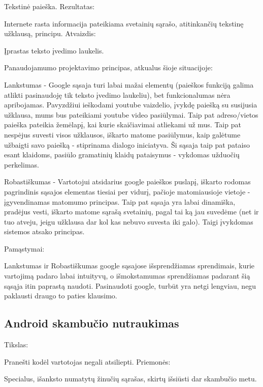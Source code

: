 ﻿\documentclass[a4paper, 12pt]{article}
\begin{document}
		Tekstinė paieška.\newline
		Rezultatas:

		Internete rasta informacija pateikiama svetainių sąrašo, atitinkančių tekstinę užklausą, principu.\newline
		Atvaizdis:

		Įprastas teksto įvedimo laukelis.\newline

		Panaudojamumo projektavimo principas, atkualus šioje situacijoje:

		Lankstumas - Google sąsaja turi labai mažai elementų (paieškos funkciją galima atlikti pasinaudoję tik teksto įvedimo laukeliu),
		bet funkcionalumas nėra apribojamas. Pavyzdžiui ieškodami youtube vaizdelio, įvykdę paiešką su susijusia užklausa, mums bus pateikiami
		youtube video pasiūlymai. Taip pat adreso/vietos paieška pateikia žemėlapį, kai kurie skaičiavimai atliekami už mus. Taip pat nespėjus
		suvesti visos užklausos, iškarto matome pasiūlymus, kaip galėtume užbaigti savo paiešką - stiprinama dialogo iniciatyva. Ši sąsaja
		taip pat pataiso esant klaidoms, pasiūlo gramatinių klaidų pataisymus - vykdomas užduočių perkelimas.

		Robastiškumas - Vartotojui atsidarius google paieškos puslapį, iškarto rodomas pagrindinis sąsajos elementas tiesiai per vidurį,
		pačioje matomiausioje vietoje - įgyvendinamas matomumo principas. Taip pat sąsaja yra labai dinamiška, pradėjus vesti, iškarto
		matome sąrašą svetainių, pagal tai ką jau suvedėme (net ir tuo atveju, jeigu užklausa dar kol kas nebuvo suvesta iki galo). Taigi
		įvykdomas sistemos atsako principas.

		Pamąstymai:

		Lankstumas ir Robastiškumas google sąsajose išsprendžiamas sprendimais, kurie vartojimą padaro labai intuityvų, o išmokstamumas	
		sprendžiamas padarant šią sąsąja itin paprastą naudoti. Pasinaudoti google, turbūt yra netgi lengviau, negu paklausti draugo to 
		paties klausimo.
	\subsection{Android skambučio nutraukimas}
		Tikslas:

		Pranešti kodėl vartotojas negali atsiliepti.\newline
		Priemonės:

		Specialus, išanksto numatytų žinučių sąrašas, skirtų išsiūsti dar skambučio metu.\newline
\end{document}

